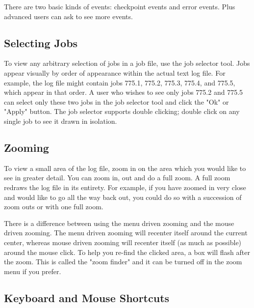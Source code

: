 There are two basic kinds of events: checkpoint events and error events.   Plus advanced users can ask to see more events. 


\subsection{\label{sec:job-selector}Selecting Jobs}

To view any arbitrary selection of jobs in a job file, use the job selector tool.  Jobs appear visually by order of appearance within the actual text log file.  For example, the log file might contain jobs
775.1, 775.2, 775.3, 775.4, and 775.5, which appear in that order.  A user who wishes to see only jobs 775.2 and 775.5 can select only these two jobs in the job selector tool and click the "Ok" or
"Apply" button.  The job selector supports double clicking; double
click on any single job to see it drawn in isolation. 

\subsection{\label{sec:zooming}Zooming}

To view a small area of the log file, zoom in on the area which you would like to see in greater detail. You can zoom in, out and do a full zoom. A full zoom redraws the log file in its entirety. For
example, if you have zoomed in very close and would like to go all the way back out, you could do so with a succession of zoom outs or with one full zoom. 

There is a difference between using the menu driven zooming and the mouse driven zooming. The menu driven zooming will recenter itself around the current center, whereas mouse driven
zooming will recenter itself (as much as possible) around the mouse click. To help you re-find the clicked area, a box will flash after the zoom. This is called the "zoom finder" and it can be turned
off in the zoom menu if you prefer. 

\subsection{\label{sec:k-m-shortcuts}Keyboard and Mouse Shortcuts}

